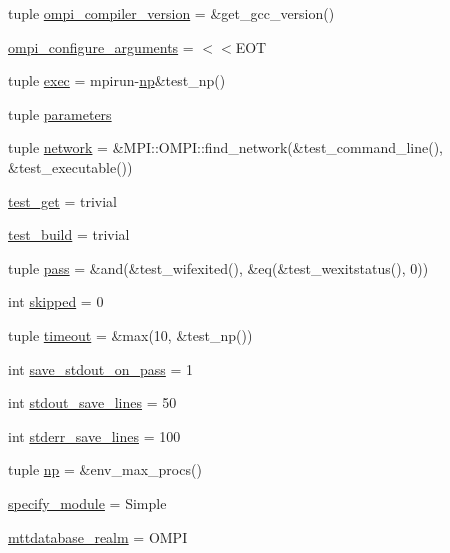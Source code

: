 \begin{DoxyCompactItemize}
\item 
tuple \hyperlink{namespacefull-trivial_ae61160048d266c12c817f0c990b0b41b}{ompi\-\_\-compiler\-\_\-version} = \&get\-\_\-gcc\-\_\-version()
\item 
\hyperlink{namespacefull-trivial_ad846b3615dd310ecef321a446f558151}{ompi\-\_\-configure\-\_\-arguments} = $<$$<$E\-O\-T
\item 
tuple \hyperlink{namespacefull-trivial_a96c49e3c0c2dc3c6f9dbf27fe22ff837}{exec} = mpirun-\/\hyperlink{namespacefull-trivial_acf328fb05e5f171cd49e3b6930f21f2f}{np}\&test\-\_\-np()
\item 
tuple \hyperlink{namespacefull-trivial_a6513f5e0f867d0312f10064a0adb1740}{parameters}
\item 
tuple \hyperlink{namespacefull-trivial_aec768b574435ba99bb3d8737549d08e5}{network} = \&M\-P\-I\-::\-O\-M\-P\-I\-::find\-\_\-network(\&test\-\_\-command\-\_\-line(), \&test\-\_\-executable())
\item 
\hyperlink{namespacefull-trivial_a3973918af8b0679a239a862cdc097804}{test\-\_\-get} = trivial
\item 
\hyperlink{namespacefull-trivial_aa09bcc003045dcca018f705fcea70f0f}{test\-\_\-build} = trivial
\item 
tuple \hyperlink{namespacefull-trivial_a47d8fbeff54aeee0210d2f5d55d4fc75}{pass} = \&and(\&test\-\_\-wifexited(), \&eq(\&test\-\_\-wexitstatus(), 0))
\item 
int \hyperlink{namespacefull-trivial_a119af101bc6d9cb4061ffea6b4187230}{skipped} = 0
\item 
tuple \hyperlink{namespacefull-trivial_a87b2271fca0c5c5553c1a20d8ee1c11d}{timeout} = \&max(10, \&test\-\_\-np())
\item 
int \hyperlink{namespacefull-trivial_a648cfc9aa4be2d29a9b2cc7fa66a99de}{save\-\_\-stdout\-\_\-on\-\_\-pass} = 1
\item 
int \hyperlink{namespacefull-trivial_a701f09db43ab9e43a49aaf76aa97b131}{stdout\-\_\-save\-\_\-lines} = 50
\item 
int \hyperlink{namespacefull-trivial_ab88dfbf498ed0d90e1a0510bbbb706fa}{stderr\-\_\-save\-\_\-lines} = 100
\item 
tuple \hyperlink{namespacefull-trivial_acf328fb05e5f171cd49e3b6930f21f2f}{np} = \&env\-\_\-max\-\_\-procs()
\item 
\hyperlink{namespacefull-trivial_a8845e5ef8465c334338eba7b42c0c61c}{specify\-\_\-module} = Simple
\item 
\hyperlink{namespacefull-trivial_a5f93117c210f5de7bd0b75c05ca93072}{mttdatabase\-\_\-realm} = O\-M\-P\-I
$$
\end{DoxyCompactItemize}
